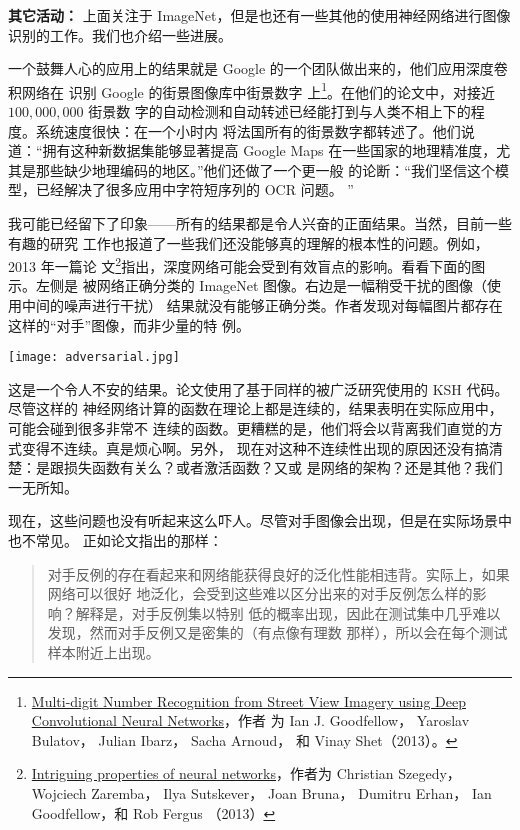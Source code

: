 \textbf{其它活动：} 上面关注于 ImageNet，但是也还有一些其他的使用神经网络进行图像
识别的工作。我们也介绍一些进展。

一个鼓舞人心的应用上的结果就是 Google 的一个团队做出来的，他们应用深度卷积网络在
识别 Google 的街景图像库中街景数字
上\footnote{\href{http://arxiv.org/abs/1312.6082}{Multi-digit Number Recognition
    from Street View Imagery using Deep Convolutional Neural Networks}，作者
  为 Ian J. Goodfellow， Yaroslav Bulatov， Julian Ibarz， Sacha
  Arnoud， 和 Vinay Shet（2013）。}。在他们的论文中，对接近 $100,000,000$ 街景数
字的自动检测和自动转述已经能打到与人类不相上下的程度。系统速度很快：在一个小时内
将法国所有的街景数字都转述了。他们说道：“拥有这种新数据集能够显著提高 Google
Maps 在一些国家的地理精准度，尤其是那些缺少地理编码的地区。”他们还做了一个更一般
的论断：“我们坚信这个模型，已经解决了很多应用中字符短序列的 OCR 问题。 ”

我可能已经留下了印象——所有的结果都是令人兴奋的正面结果。当然，目前一些有趣的研究
工作也报道了一些我们还没能够真的理解的根本性的问题。例如，2013 年一篇论
文\footnote{\href{http://arxiv.org/abs/1312.6199}{Intriguing properties of
    neural networks}，作者为 Christian Szegedy，Wojciech Zaremba， Ilya
  Sutskever， Joan Bruna， Dumitru Erhan， Ian Goodfellow，和 Rob
  Fergus （2013）}指出，深度网络可能会受到有效盲点的影响。看看下面的图示。左侧是
被网络正确分类的 ImageNet 图像。右边是一幅稍受干扰的图像（使用中间的噪声进行干扰）
结果就没有能够正确分类。作者发现对每幅图片都存在这样的“对手”图像，而非少量的特
例。

\begin{center}
  \texttt{[image: adversarial.jpg]}
\end{center}

这是一个令人不安的结果。论文使用了基于同样的被广泛研究使用的 KSH 代码。尽管这样的
神经网络计算的函数在理论上都是连续的，结果表明在实际应用中，可能会碰到很多非常不
连续的函数。更糟糕的是，他们将会以背离我们直觉的方式变得不连续。真是烦心啊。另外，
现在对这种不连续性出现的原因还没有搞清楚：是跟损失函数有关么？或者激活函数？又或
是网络的架构？还是其他？我们一无所知。

现在，这些问题也没有听起来这么吓人。尽管对手图像会出现，但是在实际场景中也不常见。
正如论文指出的那样：

\begin{quote}
  对手反例的存在看起来和网络能获得良好的泛化性能相违背。实际上，如果网络可以很好
  地泛化，会受到这些难以区分出来的对手反例怎么样的影响？解释是，对手反例集以特别
  低的概率出现，因此在测试集中几乎难以发现，然而对手反例又是密集的（有点像有理数
  那样），所以会在每个测试样本附近上出现。
\end{quote}

